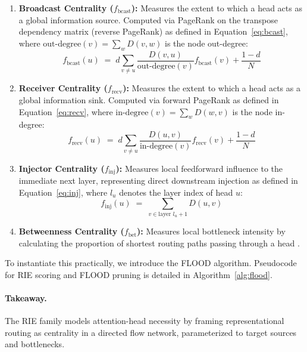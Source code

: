 \documentclass[11pt,a4paper]{article}
\theoremstyle{definition}
\theoremstyle{plain}
\begin{document}
\begin{enumerate}
    \item \textbf{Broadcast Centrality ($f_{\text{bcast}}$):} Measures the extent to which a head acts as a global information source. Computed via PageRank on the transpose dependency matrix (reverse PageRank) \citep{page1999pagerank} as defined in Equation~\ref{eq:bcast}, where $\text{out-degree}(v) = \sum_{w} D(v, w)$ is the node out-degree:
    \begin{equation}
        f_{\text{bcast}}(u) \;=\; d \sum_{v \ne u} \frac{D(v, u)}{\text{out-degree}(v)} f_{\text{bcast}}(v) + \frac{1-d}{N}
        \label{eq:bcast}
    \end{equation}
    \item \textbf{Receiver Centrality ($f_{\text{recv}}$):} Measures the extent to which a head acts as a global information sink. Computed via forward PageRank as defined in Equation~\ref{eq:recv}, where $\text{in-degree}(v) = \sum_{w} D(w, v)$ is the node in-degree:
    \begin{equation}
        f_{\text{recv}}(u) \;=\; d \sum_{v \ne u} \frac{D(u, v)}{\text{in-degree}(v)} f_{\text{recv}}(v) + \frac{1-d}{N}
        \label{eq:recv}
    \end{equation}
    \item \textbf{Injector Centrality ($f_{\text{inj}}$):} Measures local feedforward influence to the immediate next layer, representing direct downstream injection as defined in Equation~\ref{eq:inj}, where $l_u$ denotes the layer index of head $u$:
    \begin{equation}
        f_{\text{inj}}(u) \;=\; \sum_{v \in \text{layer } l_u+1} D(u, v)
        \label{eq:inj}
    \end{equation}
    \item \textbf{Betweenness Centrality ($f_{\text{bet}}$):} Measures local bottleneck intensity by calculating the proportion of shortest routing paths passing through a head \citep{freeman1977betweenness}.
\end{enumerate}

To instantiate this practically, we introduce the FLOOD algorithm. Pseudocode for RIE scoring and FLOOD pruning is detailed in Algorithm~\ref{alg:flood}.

\paragraph{Takeaway.} The RIE family models attention-head necessity by framing representational routing as centrality in a directed flow network, parameterized to target sources and bottlenecks.
\end{document}
